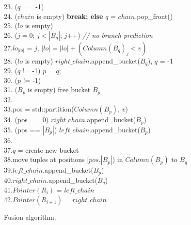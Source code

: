 \begin{figure}[t]
\begin{minipage}{4in}
{\begin{tabbing}
23.\> ($q$ == -1)\\
24.\>\> ($chain$ is empty) {\bf break; else} $q$ = $chain$.pop\_front()\\
25.\> ($lo$ is empty)\\
26.\>\> ($j=0$; $j<|B_q|$; $j$++) {\it// no branch prediction}\\
27.\>\>\>\>$lo_{|lo|}$ = $j$, $|lo| = |lo| + (Column(B_q)_j < v)$\\
28.\>\> ($lo$ is empty) $right\_chain$.append\_bucket($B_q$), $q$ = -1\\
29. ($q$ != -1) $p$ = $q$;\\
30. ($p$ != -1)\\
31.\> ($B_p$ is empty) free bucket $B_p$\\
32.\>\\
33.\>\>\>pos = std::partition($Column(B_p)$, $v$)\\
34.\>\> (pos == 0) $right\_chain$.append\_bucket($B_p$)\\
35.\>\> (pos == $|B_p|$) $left\_chain$.append\_bucket($B_p$)\\
36.\>\>\\
37.\>\>\>\>$q$ = create new bucket\\
38.\>\>\>\>move tuples at positions [$pos$,$|B_p|$) in $Column(B_p)$ to $B_q$\\
39.\>\>\>\>$left\_chain$.append\_bucket($B_p$)\\
40.\>\>\>\>$right\_chain$.append\_bucket($B_q$)\\
41.\>$Pointer(R_i)$ = $left\_chain$\\
42.\>$Pointer(R_{i+1})$ = $right\_chain$
\end{tabbing}
}
\end{minipage}
\vspace{-1em}
\caption{Fusion algorithm.}\label{algo:fusion}
\vspace{-2.5em}
\end{figure}



